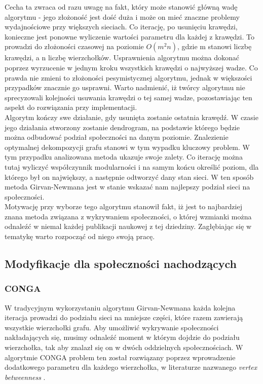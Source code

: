 \documentclass{article}
\begin{document}
Cecha ta zwraca od razu uwagę na fakt, który może stanowić główną wadę algorytmu - jego złożoność jest dość duża i może on mieć znaczne problemy wydajnościowe przy większych sieciach. Co iterację, po usunięciu krawędzi, konieczne jest ponowne wyliczenie wartości parametru dla każdej z krawędzi. To prowadzi do złożoności czasowej na poziomie $O({m}^2n)$, gdzie m stanowi liczbę krawędzi, a n liczbę wierzchołków. Usprawnienia algorytmu można dokonać poprzez wyrzucenie w jednym kroku wszystkich krawędzi o najwyższej wadze. Co prawda nie zmieni to złożoności pesymistycznej algorytmu, jednak w większości przypadków znacznie go usprawni. Warto nadmienić, iż twórcy algorytmu nie sprecyzowali kolejności usuwania krawędzi o tej samej wadze, pozostawiając ten aspekt do rozwiązania przy implementacji.\\

Algorytm kończy swe działanie, gdy usunięta zostanie ostatnia krawędź. W czasie jego działania stworzony zostanie dendrogram, na podstawie którego będzie można odbudować podział społeczności na danym poziomie. Znalezienie optymalnej dekompozycji grafu stanowi w tym wypadku kluczowy problem. W tym przypadku analizowana metoda ukazuje swoje zalety. Co iterację można tutaj wyliczyć współczynnik modularności i na samym końcu określić poziom, dla którego był on największy, a następnie odtworzyć dany stan sieci. W ten sposób metoda Girvan-Newmana jest w stanie wskazać nam najlepszy podział sieci na społeczności.\\

Motywację przy wyborze tego algorytmu stanowił fakt, iż jest to najbardziej znana metoda związana z wykrywaniem społeczności, o której wzmianki można odnaleźć w niemal każdej publikacji naukowej z tej dziedziny. Zagłębiając się w tematykę warto rozpocząć od niego swoją pracę. 
\subsection{Modyfikacje dla społeczności nachodzących}
\subsubsection{CONGA}
W tradycyjnym wykorzystaniu algorytmu Girvan-Newmana każda kolejna iteracja prowadzi do podziału sieci na mniejsze części, które razem zawierają wszystkie wierzchołki grafu. Aby umożliwić wykrywanie społeczności nakładających się, musimy odnaleźć moment w którym dojdzie do podziału wierzchołka, tak aby znalazł się on w dwóch oddzielnych społecznościach. W algorytmie CONGA problem ten został rozwiązany poprzez wprowadzenie dodatkowego parametru dla każdego wierzchołka, w literaturze nazwanego \textit{vertex betweenness} \cite{is-paper2}.\\
\end{document}
